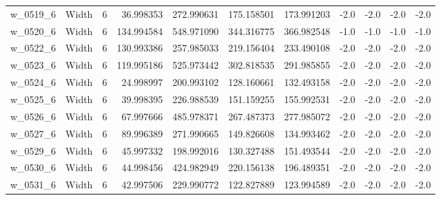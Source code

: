 \begin{tabular}{llrrrrrrrrr}
w_0519_6 &           Width &               6 &  36.998353 & 272.990631 &  175.158501 &    173.991203 &       -2.0 &       -2.0 &        -2.0 &          -2.0 \\
w_0520_6 &           Width &               6 & 134.994584 & 548.971090 &  344.316775 &    366.982548 &       -1.0 &       -1.0 &        -1.0 &          -1.0 \\
w_0522_6 &           Width &               6 & 130.993386 & 257.985033 &  219.156404 &    233.490108 &       -2.0 &       -2.0 &        -2.0 &          -2.0 \\
w_0523_6 &           Width &               6 & 119.995186 & 525.973442 &  302.818535 &    291.985855 &       -2.0 &       -2.0 &        -2.0 &          -2.0 \\
w_0524_6 &           Width &               6 &  24.998997 & 200.993102 &  128.160661 &    132.493158 &       -2.0 &       -2.0 &        -2.0 &          -2.0 \\
w_0525_6 &           Width &               6 &  39.998395 & 226.988539 &  151.159255 &    155.992531 &       -2.0 &       -2.0 &        -2.0 &          -2.0 \\
w_0526_6 &           Width &               6 &  67.997666 & 485.978371 &  267.487373 &    277.985072 &       -2.0 &       -2.0 &        -2.0 &          -2.0 \\
w_0527_6 &           Width &               6 &  89.996389 & 271.990665 &  149.826608 &    134.993462 &       -2.0 &       -2.0 &        -2.0 &          -2.0 \\
w_0529_6 &           Width &               6 &  45.997332 & 198.992016 &  130.327488 &    151.493544 &       -2.0 &       -2.0 &        -2.0 &          -2.0 \\
w_0530_6 &           Width &               6 &  44.998456 & 424.982949 &  220.156138 &    196.489351 &       -2.0 &       -2.0 &        -2.0 &          -2.0 \\
w_0531_6 &           Width &               6 &  42.997506 & 229.990772 &  122.827889 &    123.994589 &       -2.0 &       -2.0 &        -2.0 &          -2.0 \\
\bottomrule
\end{tabular}
